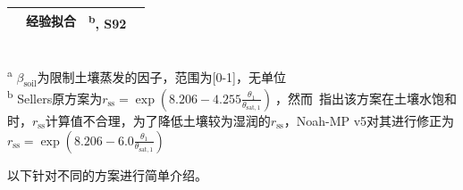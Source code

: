 {\begin{landscape}
\begin{table}[htbp]
\begin{tabular}{@{}clll@{}}
                                                                                                & 经验拟合                                                                                                                                            & \citet{s1992}\textsuperscript{b}, S92 \\ \bottomrule
      \end{tabular}
      \footnotesize                                                                            \\
      \textsuperscript{a} $\beta_{\mathrm{soil}}$为限制土壤蒸发的因子，范围为{[}0-1{]}，无单位 \\
      \textsuperscript{b} Sellers原方案为$r_{\mathrm{ss}} = \exp\left( 8.206 - 4.255\frac{\theta_{\mathrm{1}}}{\theta_{\mathrm{sat,1}}} \right)\ $，然而~\citet{sz2009}指出该方案在土壤水饱和时，$r_{\mathrm{ss}}$计算值不合理，为了降低土壤较为湿润的$r_{\mathrm{ss}}$，Noah-MP v5对其进行修正为$r_{\mathrm{ss}} = \exp\left( 8.206 - 6.0 \frac{{\theta}_{\mathrm{1}}}{\theta_{\mathrm{sat,1}}} \right)$
    \end{table}
  \end{landscape}
}

以下针对不同的方案进行简单介绍。

